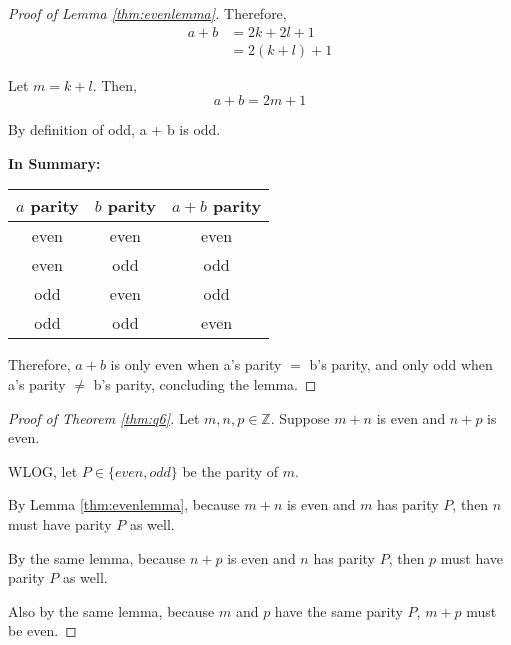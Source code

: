 \documentclass{article}
\numberwithin{subcase}{case}
\begin{document}
\begin{outline}[enumerate]
\begin{proof}[Proof of Lemma \ref{thm:evenlemma}]
            Therefore,
            \begin{equation}
                \begin{aligned}
                    a + b &= 2k + 2l + 1 \\
                    &= 2(k + l) + 1
                \end{aligned}
            \end{equation}

            Let $m = k + l$. Then,
            \begin{equation}
                a + b = 2m + 1
            \end{equation}

            By definition of odd, a + b is odd.

            \textbf{In Summary:}

            \begin{center}
                \begin{tabular}{c c | c}
                    $a$ parity & $b$ parity & $a + b$ parity \\
                    \hline
                    even & even & even \\ 
                    even & odd & odd \\ 
                    odd & even & odd \\ 
                    odd & odd & even
                \end{tabular}
            \end{center}

            Therefore, $a + b$ is only even when a's parity $=$ b's parity, and only odd when 
            a's parity $\neq$ b's parity, concluding the lemma.
        \end{proof}

        \begin{proof}[Proof of Theorem \ref{thm:q6}]
            Let $m, n, p \in \mathbb{Z}$. Suppose $m + n$ is even and $n + p$ is even. 
            
            WLOG, let $P \in \{even, odd\}$ be the parity of $m$.

            By Lemma \ref{thm:evenlemma}, because $m + n$ is even and $m$ has parity $P$, then $n$
            must have parity $P$ as well. 

            By the same lemma, because $n + p$ is even and $n$ has parity $P$, then $p$ must  have 
            parity $P$ as well.

            Also by the same lemma, because $m$ and $p$ have the same parity $P$, $m + p$ must be even.  


\end{proof}
\end{outline}
\end{document}

